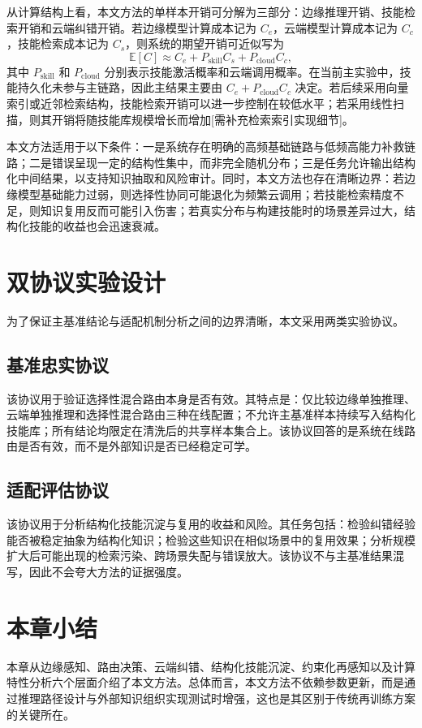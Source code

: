 从计算结构上看，本文方法的单样本开销可分解为三部分：边缘推理开销、技能检索开销和云端纠错开销。若边缘模型计算成本记为 $C_e$，云端模型计算成本记为 $C_c$，技能检索成本记为 $C_s$，则系统的期望开销可近似写为
\begin{equation}
  \mathbb{E}[C]\approx C_e + P_{\mathrm{skill}} C_s + P_{\mathrm{cloud}} C_c ,
\end{equation}
其中 $P_{\mathrm{skill}}$ 和 $P_{\mathrm{cloud}}$ 分别表示技能激活概率和云端调用概率。在当前主实验中，技能持久化未参与主链路，因此主结果主要由 $C_e + P_{\mathrm{cloud}} C_c$ 决定。若后续采用向量索引或近邻检索结构，技能检索开销可以进一步控制在较低水平；若采用线性扫描，则其开销将随技能库规模增长而增加[需补充检索索引实现细节]。

本文方法适用于以下条件：一是系统存在明确的高频基础链路与低频高能力补救链路；二是错误呈现一定的结构性集中，而非完全随机分布；三是任务允许输出结构化中间结果，以支持知识抽取和风险审计。同时，本文方法也存在清晰边界：若边缘模型基础能力过弱，则选择性协同可能退化为频繁云调用；若技能检索精度不足，则知识复用反而可能引入伤害；若真实分布与构建技能时的场景差异过大，结构化技能的收益也会迅速衰减。

\section{双协议实验设计}
\label{sec:method-protocol}

为了保证主基准结论与适配机制分析之间的边界清晰，本文采用两类实验协议。

\subsection{基准忠实协议}

该协议用于验证选择性混合路由本身是否有效。其特点是：仅比较边缘单独推理、云端单独推理和选择性混合路由三种在线配置；不允许主基准样本持续写入结构化技能库；所有结论均限定在清洗后的共享样本集合上。该协议回答的是系统在线路由是否有效，而不是外部知识是否已经稳定可学。

\subsection{适配评估协议}

该协议用于分析结构化技能沉淀与复用的收益和风险。其任务包括：检验纠错经验能否被稳定抽象为结构化知识；检验这些知识在相似场景中的复用效果；分析规模扩大后可能出现的检索污染、跨场景失配与错误放大。该协议不与主基准结果混写，因此不会夸大方法的证据强度。

\section{本章小结}
\label{sec:method-summary}

本章从边缘感知、路由决策、云端纠错、结构化技能沉淀、约束化再感知以及计算特性分析六个层面介绍了本文方法。总体而言，本文方法不依赖参数更新，而是通过推理路径设计与外部知识组织实现测试时增强，这也是其区别于传统再训练方案的关键所在。
